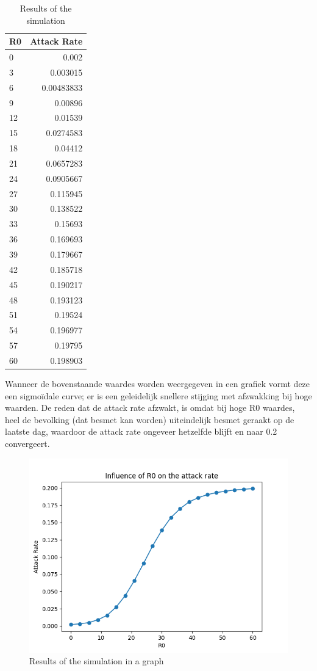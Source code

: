 \documentclass{article}
\begin{document}
\begin{table}[h]
	\centering
	\begin{tabular}{ | l | r | }
		\hline			
		\textbf{R0} & \textbf{Attack Rate}  \\ \hline
0 & 0.002 \\
3 & 0.003015 \\
6 & 0.00483833 \\
9 & 0.00896 \\
12 & 0.01539 \\
15 & 0.0274583 \\
18 & 0.04412 \\
21 & 0.0657283 \\
24 & 0.0905667 \\
27 & 0.115945 \\
30 & 0.138522 \\
33 & 0.15693 \\
36 & 0.169693 \\
39 & 0.179667 \\
42 & 0.185718 \\
45 & 0.190217 \\
48 & 0.193123 \\
51 & 0.19524 \\
54 & 0.196977 \\
57 & 0.19795 \\
60 & 0.198903 \\
		\hline  
	\end{tabular}
	\caption{Results of the simulation}
\end{table}

\newpage
 
Wanneer de bovenstaande waardes worden weergegeven in een grafiek vormt deze een sigmo\"{i}dale curve; er is een geleidelijk snellere stijging met afzwakking bij hoge waarden. De reden dat de attack rate afzwakt, is omdat bij hoge R0 waardes, heel de bevolking (dat besmet kan worden) uiteindelijk besmet geraakt op de laatste dag, waardoor de attack rate ongeveer hetzelfde blijft en naar 0.2 convergeert.

\begin{figure}[h]
	\centering
	\includegraphics[width=\textwidth]{r0_2}
	\caption{Results of the simulation in a graph}
\end{figure}
\end{document}
